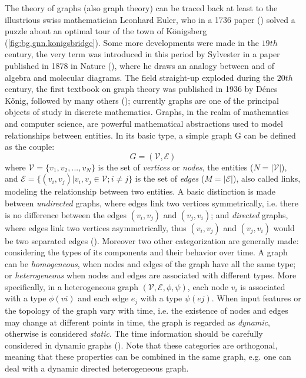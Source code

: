 \documentclass[binding=0.6cm]{sapthesis}
\newcommand{\mycite}[1]{(\cite{#1})}
\begin{document}
The theory of graphs (also graph theory) can be traced back at least to the illustrious swiss mathematician Leonhard Euler, who in a 1736 paper \mycite{gazette_1987} solved a puzzle about an optimal tour of the town of Königsberg (\cref{fig:bg.gnn.konigsbridge}). Some more developments were made in the $19th$ century, the very term  was introduced in this period by Sylvester in a paper published in 1878 in Nature \mycite{Sylvester1878ChemistryAA}, where he draws an analogy between  and  of algebra and molecular diagrams. The field straight-up exploded during the $20th$ century, the first textbook on graph theory was published in 1936 by Dénes Kőnig, followed by many others \mycite{tutte2001graph}; currently graphs are one of the principal objects of study in discrete mathematics. Graphs, in the realm of mathematics and computer science, are powerful mathematical abstractions used to model relationships between entities. In its basic type, a simple graph G can be defined as the couple:
\begin{equation}
    \label{eq:bg.gnn.graph-def}
    G = (\mathcal{V},\mathcal{E})
\end{equation}
where $\mathcal{V} = \{v_1,v_2,...,v_N\}$ is the set of \textit{vertices} or \textit{nodes}, the entities ($N = |\mathcal{V}|$), and $\mathcal{E} = \{(v_i,v_j) | v_i,v_j \in \mathcal{V}; i \ne j\}$ is the set of \textit{edges} ($M = |\mathcal{E}|$), also called links, modeling the relationship between two entities. A basic distinction is made between \textit{undirected} graphs, where edges link two vertices symmetrically, i.e. there is no difference between the edges $(v_i,v_j)$ and $(v_j,v_i)$; and \textit{directed} graphs, where edges link two vertices asymmetrically, thus $(v_i,v_j)$ and $(v_j,v_i)$ would be two separated edges \mycite{cormen2022introduction}. Moreover two other categorization are generally made: considering the types of its components and their behavior  over time. 
A graph can be \textit{homogeneous}, when nodes and edges of the graph have all the same type; or \textit{heterogeneous} when nodes and edges are associated with different types. More specifically, in a heterogeneous graph $(\mathcal{V}, \mathcal{E}, \phi, \psi)$, each node $v_i$ is associated with a type $\phi(vi)$ and each edge $e_j$ with a type $\psi(ej)$. 
When input features or the topology of the graph vary with time, i.e. the existence of nodes and edges may change at different points in time, the graph is regarded as \textit{dynamic}, otherwise is considered \textit{static}. The time information should be carefully considered in dynamic graphs \mycite{zhou2021graph,wang2021mthetgnn}. Note that these categories are orthogonal, meaning that these properties can be combined in the same graph, e.g. one can deal with a dynamic directed heterogeneous graph.
\end{document}
